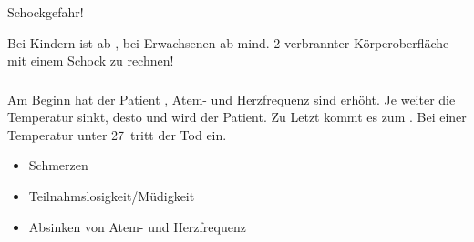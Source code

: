 \begin{Danger}
  \item Schockgefahr!
  \item Bei Kindern ist ab \EE{5\PC*}, 
  bei Erwachsenen ab \EE{10\PC*}
  mind. 2\textdegree{} verbrannter Körperoberfläche mit einem Schock zu 
  rechnen!
\end{Danger}





\subsubsection{}

\Text{\TxBeschreibung}
{%
}





\subsubsection{}

\Text{\TxBeschreibung}
{%
}


{
Am Beginn hat der Patient , Atem- und
Herzfrequenz sind erhöht.
Je weiter die Temperatur sinkt, desto 
und  wird der Patient. Zu Letzt kommt es zum
. Bei einer
Temperatur unter 27\,\DegC{} tritt der Tod ein.
}{
\begin{itemize}
  \item Schmerzen
  \item Teilnahmslosigkeit/Müdigkeit
  \item Absinken von Atem- und Herzfrequenz
\end{itemize}
}{}{}{}





